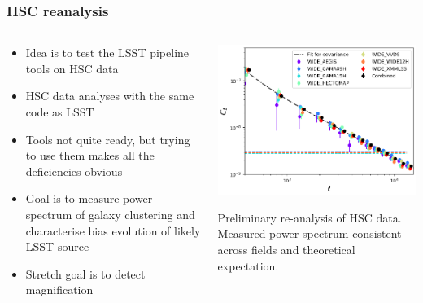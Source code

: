 \documentclass[aspectratio=169]{beamer}
\begin{document}
\begin{frame}
  \frametitle{HSC reanalysis}

  \begin{columns}
    \begin{column}{7cm}
      \begin{itemize}
      \item Idea is to test the LSST pipeline tools on HSC data
      \item HSC data analyses with the same code as LSST
      \item Tools not quite ready, but trying to use them makes all
        the deficiencies obvious
      \item Goal is to measure power-spectrum of galaxy clustering and
        characterise bias evolution of likely LSST source
      \item Stretch goal is to detect magnification
      \end{itemize}
    \end{column}
    \begin{column}{6cm}
      \includegraphics[width=\linewidth]{./cls_hsc_new.png}
      \begin{center}
        \scriptsize Preliminary re-analysis of HSC data. Measured
        power-spectrum consistent across fields and theoretical expectation.
      \end{center}

    \end{column}
  \end{columns}


\end{frame}
\end{document}
